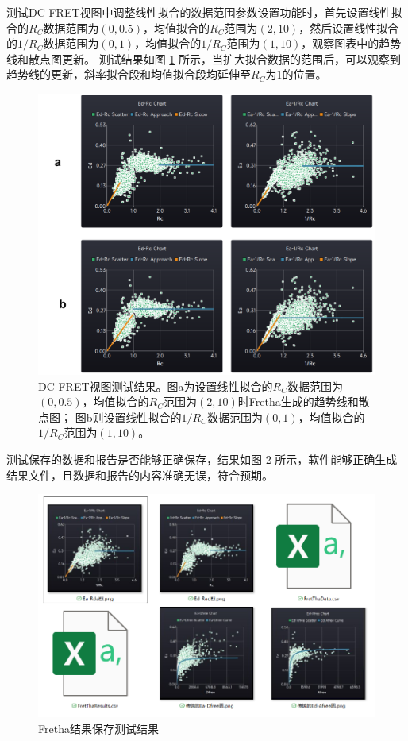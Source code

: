 测试DC-FRET视图中调整线性拟合的数据范围参数设置功能时，首先设置线性拟合的$R_C$数据范围为$(0,0.5)$，均值拟合的$R_C$范围为$(2,10)$，然后设置线性拟合的$1/R_C$数据范围为$(0,1)$，均值拟合的$1/R_C$范围为$(1,10)$，观察图表中的趋势线和散点图更新。
测试结果如图 \ref{fig:DC-FRET视图测试} 所示，当扩大拟合数据的范围后，可以观察到趋势线的更新，斜率拟合段和均值拟合段均延伸至$R_C$为1的位置。
\begin{figure}
  \centering
  \includegraphics[width=0.9\linewidth]{../figures/4/4_DC-FRET参数测试.png}
  \caption[Fretha DC-FRET视图测试结果。]{DC-FRET视图测试结果。图a为设置线性拟合的$R_C$数据范围为$(0,0.5)$，均值拟合的$R_C$范围为$(2,10)$时Fretha生成的趋势线和散点图；
  图b则设置线性拟合的$1/R_C$数据范围为$(0,1)$，均值拟合的$1/R_C$范围为$(1,10)$。}
  \label{fig:DC-FRET视图测试}
\end{figure}

测试保存的数据和报告是否能够正确保存，结果如图 \ref{fig:结果保存测试} 所示，软件能够正确生成结果文件，且数据和报告的内容准确无误，符合预期。
\begin{figure}[hbtp]
  \centering
  \includegraphics[width=0.6\linewidth]{../figures/2/2_保存数据.png}
  \caption{Fretha结果保存测试结果}
  \label{fig:结果保存测试}
\end{figure}

